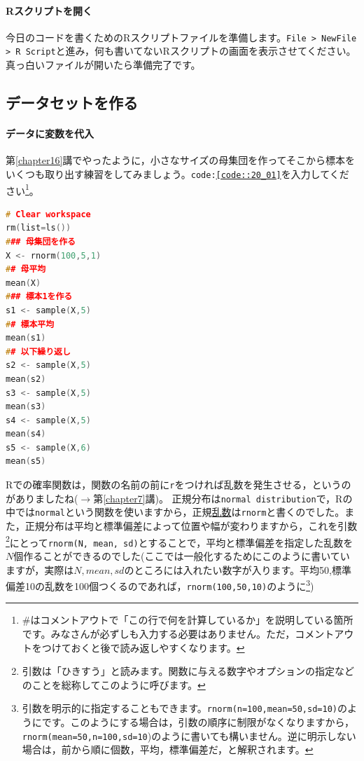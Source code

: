 \documentclass{ltjsbook}
\begin{document}
\paragraph{Rスクリプトを開く}今日のコードを書くためのRスクリプトファイルを準備します。\verb|File > NewFile > R Script|と進み，何も書いてないRスクリプトの画面を表示させてください。真っ白いファイルが開いたら準備完了です。

\subsection{データセットを作る}
\paragraph{データに変数を代入}
第\ref{chapter16}講でやったように，小さなサイズの母集団を作ってそこから標本をいくつも取り出す練習をしてみましょう。\texttt{code:\ref{code::20_01}}を入力してください\footnote{\#はコメントアウトで「この行で何を計算しているか」を説明している箇所です。みなさんが必ずしも入力する必要はありません。ただ，コメントアウトをつけておくと後で読み返しやすくなります。}。

\begin{lstlisting}[language=c++,label={code::20_01},caption={繰り返しサンプリングする}]
# Clear workspace
rm(list=ls())
### 母集団を作る
X <- rnorm(100,5,1)
## 母平均
mean(X)
### 標本1を作る
s1 <- sample(X,5)
## 標本平均
mean(s1)
## 以下繰り返し
s2 <- sample(X,5)
mean(s2)
s3 <- sample(X,5)
mean(s3)
s4 <- sample(X,5)
mean(s4)
s5 <- sample(X,6)
mean(s5)
\end{lstlisting}

Rでの確率関数は，関数の名前の前に\texttt{r}をつければ乱数を発生させる，というのがありましたね($\to$第\ref{chapter7}講)。
正規分布は\verb|normal distribution|で，Rの中では\texttt{normal}という関数を使いますから，正規\underline{乱数}は\texttt{rnorm}と書くのでした。また，正規分布は平均と標準偏差によって位置や幅が変わりますから，これを引数\footnote{引数は「ひきすう」と読みます。関数に与える数字やオプションの指定などのことを総称してこのように呼びます。}にとって\texttt{rnorm(N, mean, sd)}とすることで，平均と標準偏差を指定した乱数を$N$個作ることができるのでした(ここでは一般化するためにこのように書いていますが，実際は$N,mean,sd$のところには入れたい数字が入ります。平均50,標準偏差10の乱数を100個つくるのであれば，\texttt{rnorm(100,50,10)}のように\footnote{引数を明示的に指定することもできます。\texttt{rnorm(n=100,mean=50,sd=10)}のようにです。このようにする場合は，引数の順序に制限がなくなりますから，\texttt{rnorm(mean=50,n=100,sd=10})のように書いても構いません。逆に明示しない場合は，前から順に個数，平均，標準偏差だ，と解釈されます。})
\end{document}
